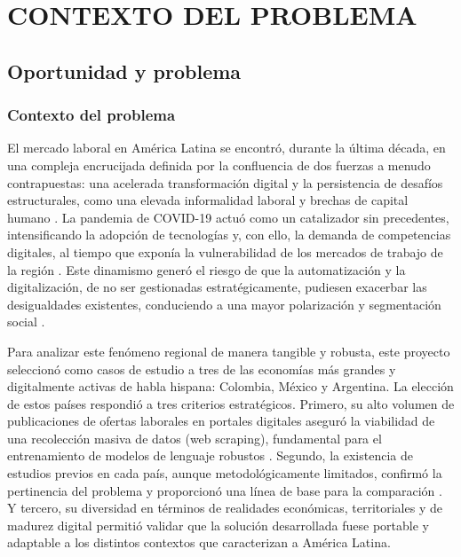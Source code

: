 \chapter{CONTEXTO DEL PROBLEMA}

\section{Oportunidad y problema}

\subsection{Contexto del problema}

El mercado laboral en América Latina se encontró, durante la última década, en una compleja encrucijada definida por la confluencia de dos fuerzas a menudo contrapuestas: una acelerada transformación digital y la persistencia de desafíos estructurales, como una elevada informalidad laboral y brechas de capital humano \cite{echeverria2022}. La pandemia de COVID-19 actuó como un catalizador sin precedentes, intensificando la adopción de tecnologías y, con ello, la demanda de competencias digitales, al tiempo que exponía la vulnerabilidad de los mercados de trabajo de la región \cite{azuara2022}. Este dinamismo generó el riesgo de que la automatización y la digitalización, de no ser gestionadas estratégicamente, pudiesen exacerbar las desigualdades existentes, conduciendo a una mayor polarización y segmentación social \cite{echeverria2022}.

Para analizar este fenómeno regional de manera tangible y robusta, este proyecto seleccionó como casos de estudio a tres de las economías más grandes y digitalmente activas de habla hispana: Colombia, México y Argentina. La elección de estos países respondió a tres criterios estratégicos. Primero, su alto volumen de publicaciones de ofertas laborales en portales digitales aseguró la viabilidad de una recolección masiva de datos (web scraping), fundamental para el entrenamiento de modelos de lenguaje robustos \cite{aguilera2018, martinez2024, rubio2024}. Segundo, la existencia de estudios previos en cada país, aunque metodológicamente limitados, confirmó la pertinencia del problema y proporcionó una línea de base para la comparación \cite{cardenas2015}. Y tercero, su diversidad en términos de realidades económicas, territoriales y de madurez digital permitió validar que la solución desarrollada fuese portable y adaptable a los distintos contextos que caracterizan a América Latina.

